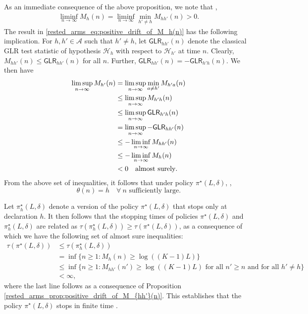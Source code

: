 As an immediate consequence of the above proposition, we note that ,
\begingroup\allowdisplaybreaks\begin{align}
	\liminf\limits_{n\to\infty}M_h(n)=\liminf\limits_{n\to\infty}\min\limits_{h'\neq h}M_{hh'}(n)>0.\label{rested_arms_eq:positive_drift_of_M_h(n)}
\end{align}\endgroup
The result in \eqref{rested_arms_eq:positive_drift_of_M_h(n)} has the following implication. For $h, h'\in \mathcal{A}$ such that $h'\neq h$, let $\textsf{GLR}_{hh'}(n)$ denote the classical GLR test statistic of hypothesis $\mathcal{H}_h$ with respect to $\mathcal{H}_{h'}$ at time $n$. Clearly, $M_{hh'}(n) \leq \textsf{GLR}_{hh'}(n)$  for all $n$. Further, $\textsf{GLR}_{hh'}(n)=-\textsf{GLR}_{h'h}(n)$. We then have
\begingroup\allowdisplaybreaks\begin{align}
	\limsup\limits_{n\to\infty}M_{h'}(n)&=\limsup\limits_{n\to\infty}\min\limits_{a\neq h'}M_{h'a}(n)\nonumber\\
	&\leq \limsup\limits_{n\to\infty}M_{h'h}(n)\nonumber\\
	&\leq \limsup\limits_{n\to\infty}\textsf{GLR}_{h'h}(n)\nonumber\\
	&=\limsup\limits_{n\to\infty}-\textsf{GLR}_{hh'}(n)\nonumber\\
	&\leq -\liminf\limits_{n\to\infty}M_{hh'}(n)\nonumber\\
	&\leq -\liminf\limits_{n\to\infty}M_{h}(n)\nonumber\\
	&<0\quad \text{\text{almost surely}}.\label{rested_arms_eq:limsup_M_{h'}(n)_less_than_0}
\end{align}\endgroup
From the above set of inequalities, it follows that under policy $\pi^\star(L,\delta)$, ,
 \begin{equation}
 	\theta(n)=h\quad \forall~n\text{ sufficiently large}.\label{rested_arms_eq:h^*(n)_equal_to_h_almost_surely}
 \end{equation}

Let $\pi^\star_h(L,\delta)$ denote a version of the policy $\pi^\star(L, \delta)$ that stops only at declaration $h$. It then follows that the stopping times of policies $\pi^\star(L,\delta)$ and $\pi^\star_h(L,\delta)$ are  related as $\tau(\pi^\star_h(L,\delta))\geq \tau(\pi^\star(L,\delta))$, as a consequence of which we have the following set of almost sure inequalities:
\begingroup\allowdisplaybreaks\begin{align}
	\tau(\pi^\star(L,\delta))
	&\leq \tau(\pi^\star_h(L,\delta))\nonumber\\
	&=\inf\{n\geq 1:M_h(n)\geq \log((K-1)L)\}\nonumber\\
	&\leq \inf\bigg\lbrace n\geq 1:M_{hh'}(n')\geq \log((K-1)L)\text{ for all }n'\geq n\text{ and for all }h'\neq h\bigg\rbrace\nonumber\\
	&<\infty,\label{rested_arms_eq:stopping_time_finite_almost_surely}
\end{align}\endgroup
where the last line follows as a consequence of Proposition \ref{rested_arms_prop:positive_drift_of_M_{hh'}(n)}. This establishes that the policy $\pi^\star(L,\delta)$ stops in finite time .

